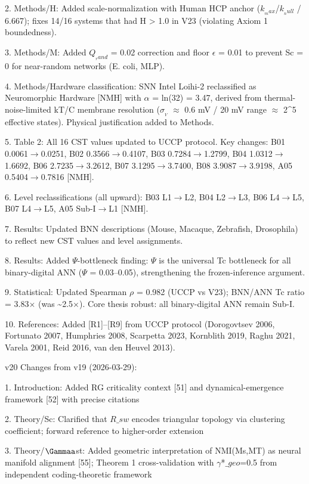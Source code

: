 \documentclass[a4paper,12pt]{article}
\begin{document}
2. Methods/H: Added scale-normalization with Human HCP anchor ($k_{_max}$/$k_{_null}$ / 6.667); fixes 14/16 systems that had H > 1.0 in V23 (violating Axiom 1 boundedness).

3. Methods/M: Added $Q_{_rand}$ = 0.02 correction and floor $\epsilon$ = 0.01 to prevent Sc = 0 for near-random networks (E. coli, MLP).

4. Methods/Hardware classification: SNN Intel Loihi-2 reclassified as Neuromorphic Hardware [NMH] with $\alpha$ = ln(32) = 3.47, derived from thermal-noise-limited kT/C membrane resolution ($\sigma_{_V}$ $\approx$ 0.6 mV / 20 mV range $\approx$ 2^5 effective states). Physical justification added to Methods.

5. Table 2: All 16 CST values updated to UCCP protocol. Key changes: B01 0.0061$\rightarrow$0.0251, B02 0.3566$\rightarrow$0.4107, B03 0.7284$\rightarrow$1.2799, B04 1.0312$\rightarrow$1.6692, B06 2.7235$\rightarrow$3.2612, B07 3.1295$\rightarrow$3.7400, B08 3.9087$\rightarrow$3.9198, A05 0.5404$\rightarrow$0.7816 [NMH].

6. Level reclassifications (all upward): B03 L1$\rightarrow$L2, B04 L2$\rightarrow$L3, B06 L4$\rightarrow$L5, B07 L4$\rightarrow$L5, A05 Sub-I$\rightarrow$L1 [NMH].

7. Results: Updated BNN descriptions (Mouse, Macaque, Zebrafish, Drosophila) to reflect new CST values and level assignments.

8. Results: Added $\Psi$-bottleneck finding: $\Psi$ is the universal Tc bottleneck for all binary-digital ANN ($\Psi$ = 0.03--0.05), strengthening the frozen-inference argument.

9. Statistical: Updated Spearman $\rho$ = 0.982 (UCCP vs V23); BNN/ANN Tc ratio = 3.83$\times$ (was \textasciitilde{}2.5$\times$). Core thesis robust: all binary-digital ANN remain Sub-I.

10. References: Added [R1]--[R9] from UCCP protocol (Dorogovtsev 2006, Fortunato 2007, Humphries 2008, Scarpetta 2023, Kornblith 2019, Raghu 2021, Varela 2001, Reid 2016, van den Heuvel 2013).

v20 Changes from v19 (2026-03-29):

1. Introduction: Added RG criticality context [51] and dynamical-emergence framework [52] with precise citations

2. Theory/Sc: Clarified that $R\_{sw}$ encodes triangular topology via clustering coefficient; forward reference to higher-order extension

3. Theory/$\Gammaa$st: Added geometric interpretation of NMI(Ms,MT) as neural manifold alignment [55]; Theorem 1 cross-validation with $\gamma$*$\_geo$=0.5 from independent coding-theoretic framework
\end{document}
